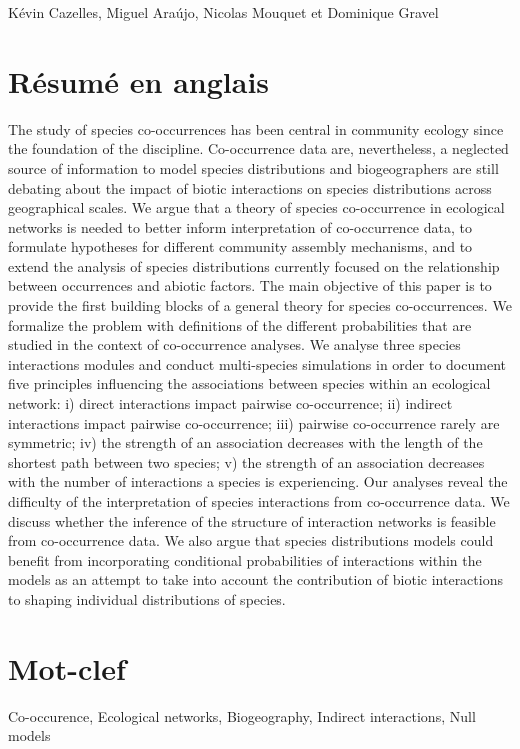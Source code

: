 Kévin Cazelles, Miguel Ara\'ujo, Nicolas Mouquet et Dominique Gravel

\section{Résumé en anglais}

The study of species co-occurrences has been central in community ecology since the foundation of the discipline. Co-occurrence data are, nevertheless, a neglected source of information to model species distributions and biogeographers are still debating about the impact of biotic interactions on species distributions across geographical scales. We argue that a theory of species co-occurrence in ecological networks is needed to better inform interpretation of co-occurrence data, to formulate hypotheses for different community assembly mechanisms, and to extend the analysis of species distributions currently focused on the relationship between occurrences and abiotic factors. The main objective of this paper is to provide the first building blocks of a general theory for species co-occurrences. We formalize the problem with definitions of the different probabilities that are studied in the context of co-occurrence analyses. We analyse three species interactions modules and conduct multi-species simulations in order to document five principles influencing the associations between  species within an ecological network: i) direct interactions impact pairwise co-occurrence; ii) indirect interactions impact pairwise co-occurrence; iii) pairwise co-occurrence rarely are symmetric; iv) the strength of an association decreases with the length of the shortest path between two species; v) the strength of an association decreases with the number of interactions a species is experiencing. Our analyses reveal the difficulty of the interpretation of species interactions from co-occurrence data. We discuss whether the inference of the structure of interaction networks is feasible from co-occurrence data. We also argue that species distributions models could benefit from incorporating conditional probabilities of interactions within the models as an attempt to take into account the contribution of biotic interactions to shaping individual distributions of species.

\section{Mot-clef}

Co-occurence, Ecological networks, Biogeography, Indirect interactions, Null models


